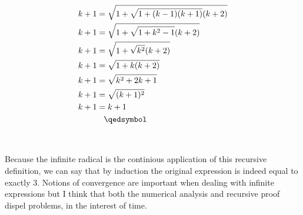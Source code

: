 \documentclass[12pt]{article}
\begin{document}
\begin{align*}
k + 1 &= \sqrt{1+\sqrt{1+(k-1)(k+1)}(k+2)}\\
k + 1 &= \sqrt{1+\sqrt{1+k^2-1}(k+2)}\\
k + 1 &= \sqrt{1+\sqrt{k^2}(k+2)}\\
k + 1 &= \sqrt{1+k(k+2)}\\
k + 1 &= \sqrt{k^2+2k+1}\\
k + 1 &= \sqrt{(k+1)^2}\\
k + 1 &= k+1\\
&\hspace{0.3cm}\qedsymbol
\end{align*}
\\\\Because the infinite radical is the continious application of this recursive definition, we can say that by induction the original expression is indeed equal to exactly 3. Notions of convergence are important when dealing with infinite expressions but I think that both the numerical analysis and recursive proof dispel problems, in the interest of time.
\end{document}
